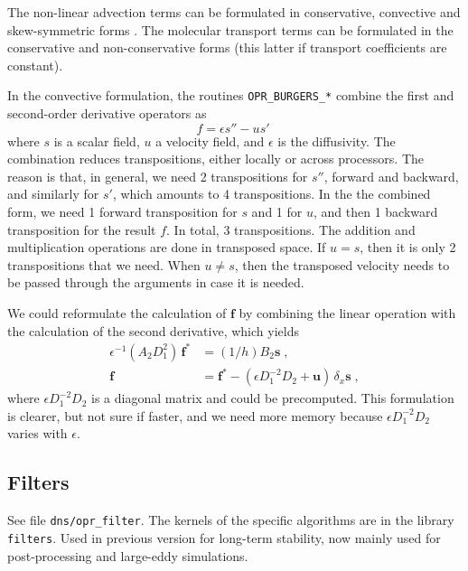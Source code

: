 The non-linear advection terms can be formulated in conservative, convective and
skew-symmetric forms \citep{Blaisdell:1996,Kravchenko:1997}. The molecular
transport terms can be formulated in the conservative and non-conservative forms
(this latter if transport coefficients are constant).

In the convective formulation, the routines {\tt OPR\_BURGERS\_*} combine the first and second-order derivative operators as 
\begin{equation}
f=\epsilon s'' - u s'\;
\end{equation}
where $s$ is a scalar field, $u$ a velocity field, and $\epsilon$ is the diffusivity. The combination reduces transpositions, either locally or across processors. The reason is that, in general, we need 2 transpositions for $s''$, forward and backward, and similarly for $s'$, which amounts to 4 transpositions. In the the combined form, we need 1 forward transposition for $s$ and 1 for $u$, and then 1 backward transposition for the result $f$. In total, 3 transpositions. The addition and multiplication operations are done in transposed space. If $u= s$, then it is only 2 transpositions that we need. When $u\ne s$, then the transposed velocity needs to be passed through the arguments in case it is needed.

We could reformulate the calculation of $\mathbf{f}$ by combining the linear operation with the calculation of the second derivative, which yields
\begin{subequations}
  \begin{align}
    \epsilon^{-1}(A_2D_1^2)\, \mathbf{f}^*&=(1/h)B_2 \mathbf{s} \;,\\
    \mathbf{f}&= \mathbf{f}^*- (\epsilon D_1^{-2}D_2 + \mathbf{u})\,\delta_x  \mathbf{s} \;,
  \end{align}
\end{subequations}
where $\epsilon D_1^{-2}D_2$ is a diagonal matrix and could be precomputed. This formulation is clearer, but not sure if faster, and we need more memory because $\epsilon D_1^{-2}D_2$ varies with $\epsilon$.

\subsection{Filters}

See file {\tt dns/opr\_filter}.  The kernels of the specific algorithms are in the library {\tt filters}. Used in previous version for long-term stability, now mainly used for post-processing and large-eddy simulations.

